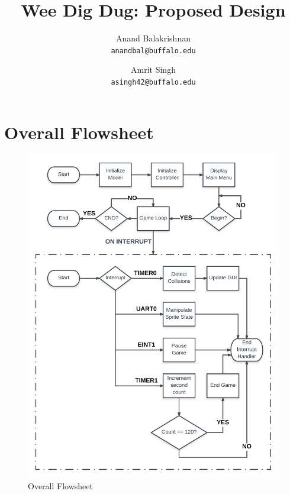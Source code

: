 
\usepackage{float}

\title{Wee Dig Dug: Proposed Design}
\author{
	Anand Balakrishnan \\ \texttt{anandbal@buffalo.edu}
	\and
	Amrit Singh \\ \texttt{asingh42@buffalo.edu}
}


\maketitle
\tableofcontents\newpage


\section{Overall Flowsheet}

\begin{figure}[H]
	\centering
	\includegraphics[width=0.8\linewidth]{flowsheets/overall.png}
	\caption{\label{fig:overall}Overall Flowsheet}
\end{figure}
\newpage

